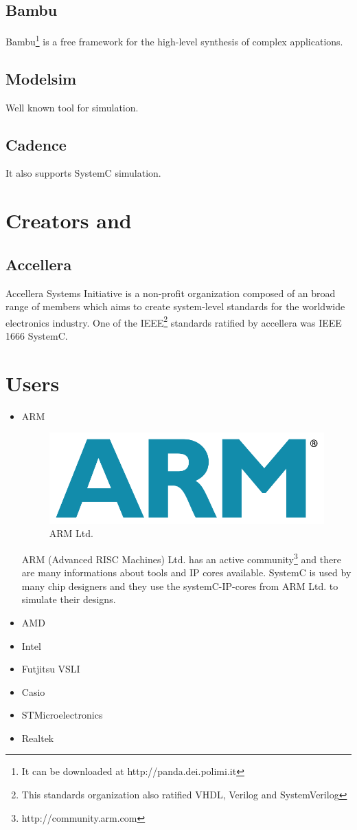 \documentclass{article}
\begin{document}
	  \subsection{Bambu}
	  Bambu\footnote{It can be downloaded at http://panda.dei.polimi.it} is a free framework for the high-level synthesis of complex applications.
	  
	  \subsection{Modelsim}
	  Well known tool for simulation.
	  
	  \subsection{Cadence}
	  It also supports SystemC simulation.
	\section{Creators and }
	  \subsection{Accellera}
	  Accellera Systems Initiative is a non-profit organization composed of an broad range of members which aims to create system-level standards for the worldwide electronics industry.
	  One of the IEEE\footnote{This standards organization also ratified VHDL, Verilog and SystemVerilog} standards ratified by accellera was IEEE 1666 SystemC.
	  
	\section{Users}
	  \begin{itemize}
	  \item{ARM}
	      \begin{figure}[hp]
		\centering
		\includegraphics[scale=0.18]{../pictures/armlogo.jpg}
		\caption{ARM Ltd.}
		\label{fig:arm}
	      \end{figure}  
	      ARM (Advanced RISC Machines) Ltd. has an active community\footnote{http://community.arm.com} and there are many informations about tools and IP cores available.
	      SystemC is used by many chip designers and they use the systemC-IP-cores from ARM Ltd. to simulate their designs.
	   \item{AMD}
	   \item{Intel}	    
	   \item{Futjitsu VSLI}	    
	   \item{Casio}	    
	   \item{STMicroelectronics}
	   \item{Realtek}
	  \end{itemize}
	  


\end{document}
